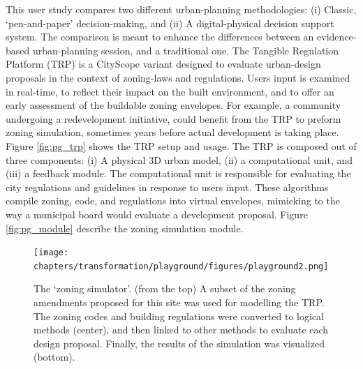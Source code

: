 {    {
        This user study compares two different urban-planning methodologies: (i) Classic, `pen-and-paper' decision-making, and (ii) A digital-physical decision support system. The comparison is meant to enhance the differences between an evidence-based urban-planning session, and a traditional one.
        The Tangible Regulation Platform (TRP) is a CityScope variant designed to evaluate urban-design proposals in the context of zoning-laws and regulations. Users input is examined in real-time, to reflect their impact on the built environment, and to offer an early assessment of the buildable zoning envelopes. For example, a community undergoing a redevelopment initiative, could benefit from the TRP to preform zoning simulation, sometimes years before actual development is taking place. Figure \eqref{fig:pg_trp} shows the TRP setup and usage.
        \newline
        The TRP is composed out of three components: (i) A physical 3D urban model, (ii) a computational unit, and (iii) a feedback module. The computational unit is responsible for evaluating the city regulations and guidelines in response to users input. These algorithms compile zoning, code, and regulations into virtual envelopes, mimicking to the way a municipal board would evaluate a development proposal. Figure \eqref{fig:pg_module} describe the zoning simulation module.
    }

    \begin{figure}[!htb]
        \begin{center}
            \texttt{[image: chapters/transformation/playground/figures/playground2.png]}
        \end{center}
        \caption{The `zoning simulator'. (from the top) A subset of the zoning amendments proposed for this site was used for modelling the TRP. The zoning codes and building regulations were converted to logical methods (center), and then linked to other methods to evaluate each design proposal. Finally, the results of the simulation was visualized (bottom).}
        \label{fig:pg_module}
    \end{figure}

}
